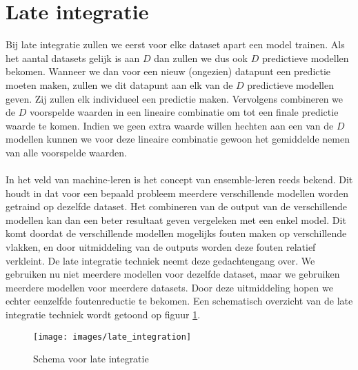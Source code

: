 \section{Late integratie}
\label{sec:D:integratie-laat}
Bij late integratie zullen we eerst voor elke dataset apart een model trainen. Als het aantal datasets gelijk is aan $D$ dan zullen we dus ook $D$ predictieve modellen bekomen. Wanneer we dan voor een nieuw (ongezien) datapunt een predictie moeten maken, zullen we dit datapunt aan elk van de $D$ predictieve modellen geven. Zij zullen elk individueel een predictie maken. Vervolgens combineren we de $D$ voorspelde waarden in een lineaire combinatie om tot een finale predictie waarde te komen. Indien we geen extra waarde willen hechten aan een van de $D$ modellen kunnen we voor deze lineaire combinatie gewoon het gemiddelde nemen van alle voorspelde waarden. \\ \\
In het veld van machine-leren is het concept van ensemble-leren reeds bekend. Dit houdt in dat voor een bepaald probleem meerdere verschillende modellen worden getraind op dezelfde dataset. Het combineren van de output van de verschillende modellen kan dan een beter resultaat geven vergeleken met een enkel model. Dit komt doordat de verschillende modellen mogelijks fouten maken op verschillende vlakken, en door uitmiddeling van de outputs worden deze fouten relatief verkleint. De late integratie techniek neemt deze gedachtengang over. We gebruiken nu niet meerdere modellen voor dezelfde dataset, maar we gebruiken meerdere modellen voor meerdere datasets. Door deze uitmiddeling hopen we echter eenzelfde foutenreductie te bekomen. Een schematisch overzicht van de late integratie techniek wordt getoond op figuur \ref{fig:D:integratie-laat}.
\begin{figure}
	\centering
	\texttt{[image: images/late\_integration]}
	\caption{Schema voor late integratie}
	\label{fig:D:integratie-laat}
\end{figure}

